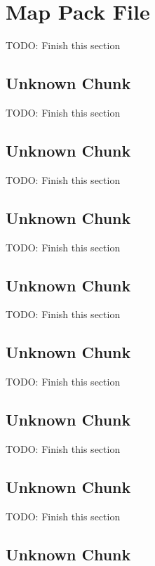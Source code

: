 \section{Map Pack File}
\label{sec:pfmapc}

TODO: Finish this section

\subsection{Unknown Chunk}
\label{subsec:pfmapcchunkaudi}

TODO: Finish this section

\subsection{Unknown Chunk}
\label{subsec:pfmapcchunkmsn}

TODO: Finish this section

\subsection{Unknown Chunk}
\label{subsec:pfmapcchunkparm}

TODO: Finish this section

\subsection{Unknown Chunk}
\label{subsec:pfmapcchunkshor}

TODO: Finish this section

\subsection{Unknown Chunk}
\label{subsec:pfmapcchunksurf}

TODO: Finish this section

\subsection{Unknown Chunk}
\label{subsec:pfmapcchunktrni}

TODO: Finish this section

\subsection{Unknown Chunk}
\label{subsec:pfmapcchunkarea}

TODO: Finish this section

\subsection{Unknown Chunk}
\label{subsec:pfmapcchunkhavk}

